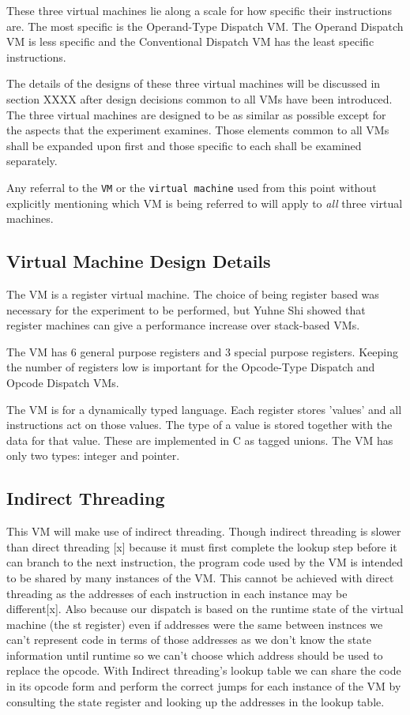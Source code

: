 \documentclass[english,a4paper]{article}
\begin{document}
These three virtual machines lie along a scale for how specific their 
instructions are. The most specific is the Operand-Type Dispatch VM. 
The Operand Dispatch VM is less specific and the Conventional 
Dispatch VM has the least specific instructions.

The details of the designs of these three virtual machines will be 
discussed in section XXXX after design decisions common to all VMs 
have been introduced. The three virtual machines are designed to be 
as similar as possible except for the aspects that the experiment 
examines. Those elements common to all VMs shall be expanded upon 
first and those specific to each shall be examined separately. 

Any referral to the \verb|VM| or the \verb|virtual machine| used from this point without explicitly mentioning which VM is being referred to will apply to \emph{all} three virtual machines.

\subsection{Virtual Machine Design Details}

The VM is a register virtual machine. The choice of being register based was necessary for the experiment to be performed, but Yuhne Shi\cite{Shi2007} showed that register machines can give a performance increase over stack-based VMs.

The VM has 6 general purpose registers and 3 special purpose
registers. Keeping the number of registers low is important for the Opcode-Type Dispatch and Opcode Dispatch VMs. 

The VM is for a dynamically typed language. Each register
stores 'values' and all instructions act on those values. The type of
a value is stored together with the data for that value. These are
implemented in C as tagged unions. The VM has only two types: integer
and pointer.

\subsection{Indirect Threading}

This VM will make use of indirect threading. Though indirect threading
is slower than direct threading {[}x{]} because it must first complete
the lookup step before it can branch to the next instruction, the
program code used by the VM is intended to be shared by many instances
of the VM. This cannot be achieved with direct threading as the
addresses of each instruction in each instance may be
different{[}x{]}. Also because our dispatch is based on the runtime
state of the virtual machine (the st register) even if addresses were
the same between instnces we can't represent code in terms of those
addresses as we don't know the state information until runtime so we
can't choose which address should be used to replace the opcode. With
Indirect threading's lookup table we can share the code in its opcode
form and perform the correct jumps for each instance of the VM by
consulting the state register and looking up the addresses in the
lookup table.
\end{document}
